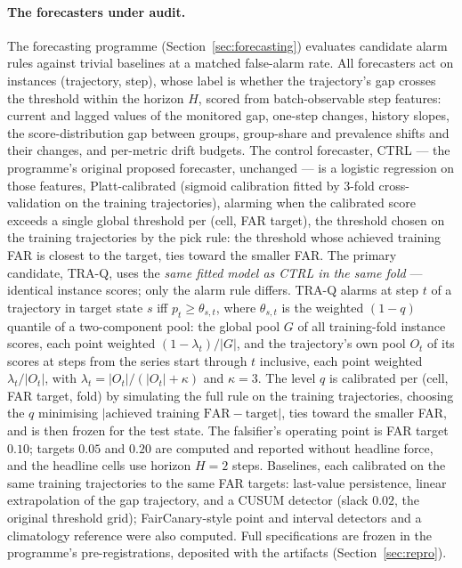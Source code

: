 \documentclass[11pt]{article}
\begin{document}
\paragraph{The forecasters under audit.} The forecasting programme (Section~\ref{sec:forecasting}) evaluates candidate alarm rules against trivial baselines at a matched false-alarm rate. All forecasters act on instances (trajectory, step), whose label is whether the trajectory's gap crosses the threshold within the horizon $H$, scored from batch-observable step features: current and lagged values of the monitored gap, one-step changes, history slopes, the score-distribution gap between groups, group-share and prevalence shifts and their changes, and per-metric drift budgets. The control forecaster, CTRL --- the programme's original proposed forecaster, unchanged --- is a logistic regression on those features, Platt-calibrated (sigmoid calibration fitted by 3-fold cross-validation on the training trajectories), alarming when the calibrated score exceeds a single global threshold per (cell, FAR target), the threshold chosen on the training trajectories by the pick rule: the threshold whose achieved training FAR is closest to the target, ties toward the smaller FAR. The primary candidate, TRA-Q, uses the \emph{same fitted model as CTRL in the same fold} --- identical instance scores; only the alarm rule differs. TRA-Q alarms at step $t$ of a trajectory in target state $s$ iff $p_t \ge \theta_{s,t}$, where $\theta_{s,t}$ is the weighted $(1-q)$ quantile of a two-component pool: the global pool $G$ of all training-fold instance scores, each point weighted $(1-\lambda_t)/|G|$, and the trajectory's own pool $O_t$ of its scores at steps from the series start through $t$ inclusive, each point weighted $\lambda_t/|O_t|$, with $\lambda_t = |O_t| / (|O_t| + \kappa)$ and $\kappa = 3$. The level $q$ is calibrated per (cell, FAR target, fold) by simulating the full rule on the training trajectories, choosing the $q$ minimising $|\text{achieved training FAR} - \text{target}|$, ties toward the smaller FAR, and is then frozen for the test state. The falsifier's operating point is FAR target $0.10$; targets $0.05$ and $0.20$ are computed and reported without headline force, and the headline cells use horizon $H = 2$ steps. Baselines, each calibrated on the same training trajectories to the same FAR targets: last-value persistence, linear extrapolation of the gap trajectory, and a CUSUM detector (slack $0.02$, the original threshold grid); FairCanary-style point and interval detectors and a climatology reference were also computed. Full specifications are frozen in the programme's pre-registrations, deposited with the artifacts (Section~\ref{sec:repro}).
\end{document}
